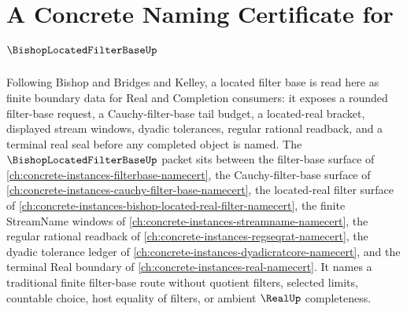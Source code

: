 \chapter{A Concrete Naming Certificate for $\BishopLocatedFilterBaseUp$}
\label{ch:concrete-instances-bishop-located-filter-base-namecert}

Following Bishop and Bridges and Kelley, a located filter base is read here as finite boundary data for Real and Completion consumers: it exposes a rounded filter-base request, a Cauchy-filter-base tail budget, a located-real bracket, displayed stream windows, dyadic tolerances, regular rational readback, and a terminal real seal before any completed object is named. The $\BishopLocatedFilterBaseUp$ packet sits between the filter-base surface of \autoref{ch:concrete-instances-filterbase-namecert}, the Cauchy-filter-base surface of \autoref{ch:concrete-instances-cauchy-filter-base-namecert}, the located-real filter surface of \autoref{ch:concrete-instances-bishop-located-real-filter-namecert}, the finite StreamName windows of \autoref{ch:concrete-instances-streamname-namecert}, the regular rational readback of \autoref{ch:concrete-instances-regseqrat-namecert}, the dyadic tolerance ledger of \autoref{ch:concrete-instances-dyadicratcore-namecert}, and the terminal Real boundary of \autoref{ch:concrete-instances-real-namecert}. It names a traditional finite filter-base route without quotient filters, selected limits, countable choice, host equality of filters, or ambient $\RealUp$ completeness.

